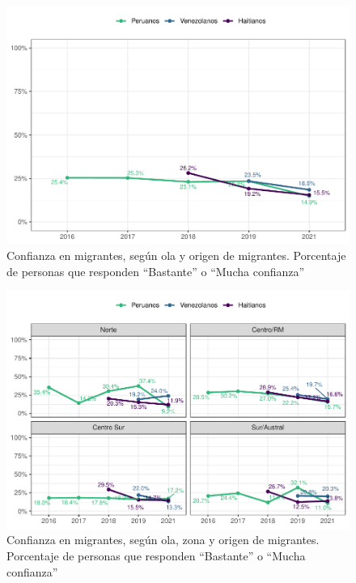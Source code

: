 \documentclass[
  12pt,
  openany]{book}
\begin{document}
\begin{figure}

{\centering \includegraphics{reporte-elsoc_files/figure-latex/conf-wave-1} 

}

\caption{Confianza en migrantes, según ola y origen de migrantes. Porcentaje de personas que responden “Bastante” o “Mucha confianza”}\label{fig:conf-wave}
\end{figure}

\begin{figure}

{\centering \includegraphics{reporte-elsoc_files/figure-latex/conf-zona-1} 

}

\caption{Confianza en migrantes, según ola, zona y origen de migrantes. Porcentaje de personas que responden “Bastante” o “Mucha confianza”}\label{fig:conf-zona}
\end{figure}
\end{document}
